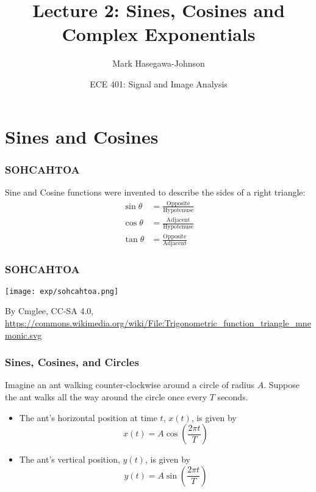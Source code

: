\documentclass{beamer}
\title{Lecture 2: Sines, Cosines and Complex Exponentials}
\author{Mark Hasegawa-Johnson}
\date{ECE 401: Signal and Image Analysis}
\begin{document}
\begin{frame}
  \maketitle
\end{frame}

\begin{frame}
  \tableofcontents
\end{frame}

\section[Cosines]{Sines and Cosines}
\setcounter{subsection}{1}

\begin{frame}
  \frametitle{SOHCAHTOA}

  Sine and Cosine functions were invented to describe the sides of a right triangle:
  \begin{align*}
    \sin\theta &= \frac{\mbox{Opposite}}{\mbox{Hypotenuse}}\\
    \cos\theta &= \frac{\mbox{Adjacent}}{\mbox{Hypotenuse}}\\
    \tan\theta &= \frac{\mbox{Opposite}}{\mbox{Adjacent}}
  \end{align*}
\end{frame}

\begin{frame}
  \frametitle{SOHCAHTOA}

  \centerline{\texttt{[image: exp/sohcahtoa.png]}}
  \begin{tiny}
    By Cmglee, CC-SA 4.0,
    \url{https://commons.wikimedia.org/wiki/File:Trigonometric_function_triangle_mnemonic.svg}
  \end{tiny}
\end{frame}

\begin{frame}
  \frametitle{Sines, Cosines, and Circles}

  Imagine an ant walking counter-clockwise around a circle of radius $A$.
  Suppose the ant walks all the way around the circle once every $T$ seconds.
  \begin{itemize}
  \item The ant's horizontal position at time $t$, $x(t)$, is given by
    \[
    x(t) = A\cos\left(\frac{2\pi t}{T}\right)
    \]
  \item The ant's vertical position, $y(t)$, is given by
    \[
    y(t) = A\sin\left(\frac{2\pi t}{T}\right)
    \]
  \end{itemize}
\end{frame}
\end{document}
